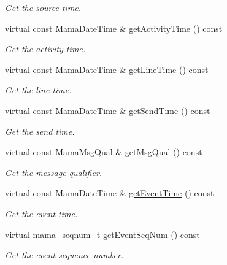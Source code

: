 \begin{CompactItemize}
\begin{CompactList}\small\item\em Get the source time. \item\end{CompactList}\item 
virtual const Mama\-Date\-Time \& \hyperlink{classWombat_1_1MamdaNewsHeadline_cbd418bb5063ec7b524a50818f8a0893}{get\-Activity\-Time} () const 
\begin{CompactList}\small\item\em Get the activity time. \item\end{CompactList}\item 
virtual const Mama\-Date\-Time \& \hyperlink{classWombat_1_1MamdaNewsHeadline_e32eaf99ac790130beb93eb03ad2b562}{get\-Line\-Time} () const 
\begin{CompactList}\small\item\em Get the line time. \item\end{CompactList}\item 
virtual const Mama\-Date\-Time \& \hyperlink{classWombat_1_1MamdaNewsHeadline_aaae18e2229981540e00408cad367103}{get\-Send\-Time} () const 
\begin{CompactList}\small\item\em Get the send time. \item\end{CompactList}\item 
virtual const Mama\-Msg\-Qual \& \hyperlink{classWombat_1_1MamdaNewsHeadline_cce176e4bbbebb5e0da87beee835de16}{get\-Msg\-Qual} () const 
\begin{CompactList}\small\item\em Get the message qualifier. \item\end{CompactList}\item 
virtual const Mama\-Date\-Time \& \hyperlink{classWombat_1_1MamdaNewsHeadline_c5172910dd6b87284540452e7267b14e}{get\-Event\-Time} () const 
\begin{CompactList}\small\item\em Get the event time. \item\end{CompactList}\item 
virtual mama\_\-seqnum\_\-t \hyperlink{classWombat_1_1MamdaNewsHeadline_f89a01f21fc32da059c7ab954f5d15c6}{get\-Event\-Seq\-Num} () const 
\begin{CompactList}\small\item\em Get the event sequence number. \item\end{CompactList}\item 

\end{CompactItemize}
